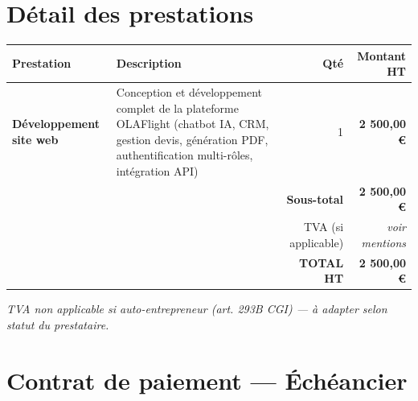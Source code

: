\documentclass[a4paper,11pt]{article}
\begin{document}
\vspace{14pt}

\section{Détail des prestations}

\begin{tabularx}{\textwidth}{>{\bfseries}p{5.5cm} X r r}
  \toprule
  \rowcolor{primary}
  \color{white}Prestation & \color{white}Description & \color{white}Qté & \color{white}Montant HT \\
  \midrule
  Développement site web & Conception et développement complet de la plateforme OLAFlight (chatbot IA, CRM, gestion devis, génération PDF, authentification multi-rôles, intégration API) & 1 & \textbf{2 500,00 €} \\
  \midrule
  \rowcolor{lightgray}
  & & \textbf{Sous-total} & \textbf{2 500,00 €} \\
  \rowcolor{lightgray}
  & & TVA (si applicable) & \textit{voir mentions} \\
  \rowcolor{lightgray}
  & & \textbf{TOTAL HT} & \textbf{2 500,00 €} \\
  \bottomrule
\end{tabularx}

\vspace{6pt}
{\small\color{midgray}\textit{TVA non applicable si auto-entrepreneur (art. 293B CGI) — à adapter selon statut du prestataire.}}

\vspace{14pt}

\section{Contrat de paiement — Échéancier}
\end{document}
